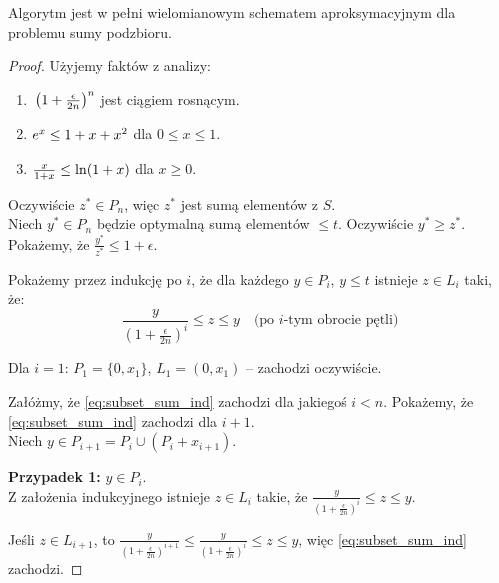 \begin{theorem}
	Algorytm \textnormal{} jest w pełni wielomianowym schematem aproksymacyjnym dla problemu sumy podzbioru.
\end{theorem}

\begin{proof}
	Użyjemy faktów z analizy:
	\begin{enumerate}[nosep, label=\textbf{Fakt \arabic*}, ref=\arabic*, leftmargin=*, labelsep=1em]
		\item \label{fakt:rosnacy} $\vphantom{\left(1 + \frac{\epsilon}{2n}\right)^n} \left(1 + \frac{\epsilon}{2n}\right)^n$ jest ciągiem rosnącym.
		\item \label{fakt:exp} $\vphantom{\left(1 + \frac{\epsilon}{2n}\right)^n} e^x \le 1 + x + x^2$ dla $0 \le x \le 1$.
		\item \label{fakt:ln} $\vphantom{\left(1 + \frac{\epsilon}{2n}\right)^n} \frac{x}{1+x} \le \ln(1+x)$ dla $x \ge 0$.
	\end{enumerate}

	Oczywiście $z^* \in P_n$, więc $z^*$ jest sumą elementów z $S$. \\
	Niech $y^* \in P_n$ będzie optymalną sumą elementów $\le t$.
	Oczywiście $y^* \ge z^*$. Pokażemy, że $\frac{y^*}{z^*} \le 1 + \epsilon$.

	Pokażemy przez indukcję po $i$, że dla każdego $y \in P_i$, $y \le t$ istnieje $z \in L_i$ taki, że:
	\begin{equation} \label{eq:subset_sum_ind}
		\frac{y}{\left(1 + \frac{\epsilon}{2n}\right)^i} \le z \le y \quad \text{(po $i$-tym obrocie pętli)}
	\end{equation}

	Dla $i = 1$: $P_1 = \{0, x_1\}$, $L_1 = (0, x_1)$ -- zachodzi oczywiście.

	Załóżmy, że \eqref{eq:subset_sum_ind} zachodzi dla jakiegoś $i < n$. Pokażemy, że \eqref{eq:subset_sum_ind} zachodzi dla $i + 1$. \\
	Niech $y \in P_{i+1} = P_i \cup (P_i + x_{i+1})$.

	\textbf{Przypadek 1:} $y \in P_i$. \\
	Z założenia indukcyjnego istnieje $z \in L_i$ takie, że $\frac{y}{\left(1+\frac{\epsilon}{2n}\right)^i} \le z \le y$.

	Jeśli $z \in L_{i+1}$, to $\frac{y}{\left(1+\frac{\epsilon}{2n}\right)^{i+1}} \le \frac{y}{\left(1+\frac{\epsilon}{2n}\right)^i} \le z \le y$, więc \eqref{eq:subset_sum_ind} zachodzi.


\end{proof}
